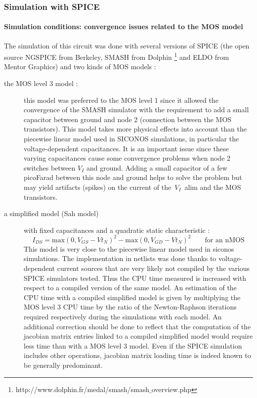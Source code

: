\subsubsection{Simulation with SPICE }

\paragraph{Simulation conditions: convergence issues related to the MOS model}
The simulation of this circuit was done with several versions of SPICE (the open source NGSPICE from Berkeley, SMASH from Dolphin \footnote{http://www.dolphin.fr/medal/smash/smash$\_$overview.php} and ELDO from Mentor Graphics) and two kinds of MOS models :
\begin{description}
\item[the MOS level 3 model :] this model was preferred to the MOS level 1 since it allowed the convergence
of the SMASH simulator with the requirement to add a small capacitor between ground and node 2 (connection between
the MOS transistors). This model takes more physical effects into account than the piecewise linear model used in SICONOS simulations,
in particular the voltage-dependent capacitances. It is an important issue since these varying capacitances
cause some convergence problems when node 2 switches between $V_I$ and ground.
Adding a small capacitor of a few picoFarad between this node and ground helps to solve the problem
but may yield artifacts (spikes) on the current of the~$V_I$~alim and the MOS transistors.
\item[a simplified model (Sah model)] with fixed capacitances and a quadratic static characteristic :
\[
I_{DS} = \textrm{max}(0,V_{GS}-Vt_N)^2 - \textrm{max}(0,V_{GD}-Vt_N)^2 \qquad \textrm{for an nMOS}
\]
This model is very close to the piecewise linear model used in {\sc siconos} simulations. The implementation in netlists was done thanks to 
voltage-dependent current sources that are very likely not compiled by the various SPICE simulators tested.
Thus the CPU time measured is increased with respect to a compiled version of the same model.
An estimation of the CPU time with a compiled simplified model is given by multiplying the MOS level 3 CPU time
by the ratio of the Newton-Raphson iterations required respectively during the simulations with each model.
An additional correction should be done to reflect that the computation of the jacobian matrix entries
linked to a compiled simplified model would require less time than with a MOS level 3 model. Even if the SPICE simulation
includes other operations, jacobian matrix loading time is indeed known to be generally predominant.
\end{description}


